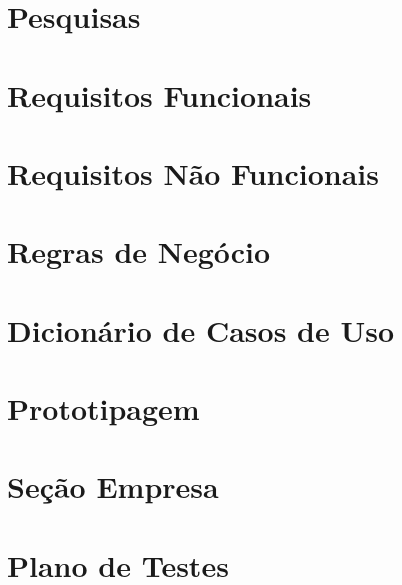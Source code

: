\documentclass[
	article,			%
	12pt,				%
	oneside,			%
	a4paper,			%
    BIBLATEX,           %
	english,			%
	brazil,				%
	sumario=tradicional
	]{abntex2}
\begin{document}

\newpage
\begin{apendicesenv}

\chapter{Pesquisas\label{pesquisas}}



\newpage

\chapter{Requisitos Funcionais\label{requisitos_f}}



\newpage

\chapter{Requisitos Não Funcionais\label{requisitos_nf}}



\newpage

\chapter{Regras de Negócio\label{regras_negocio}}



\newpage

\chapter{Dicionário de Casos de Uso\label{dicionario_casos_uso}}



\newpage

\chapter{Prototipagem\label{prototipagem}}


\newpage

\chapter{Seção Empresa \label{secao_empresa}}


\chapter{Plano de Testes}


\end{apendicesenv}
\end{document}
